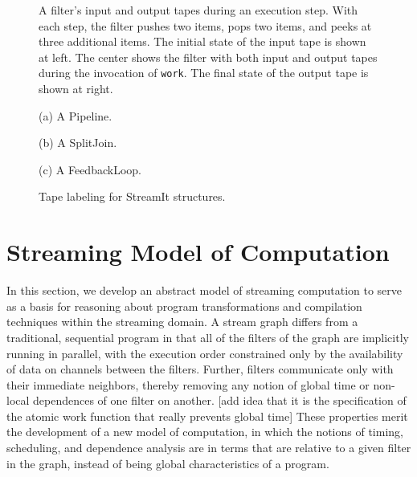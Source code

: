 \begin{figure}
\centering
\caption{A filter's input and output tapes during an execution step.
With each step, the filter pushes two items, pops two items, and peeks
at three additional items.  The initial state of the input tape is
shown at left.  The center shows the filter with both input and output
tapes during the invocation of {\tt work}.  The final state of the
output tape is shown at right.}
\label{fig:tape}
\end{figure}

\begin{figure}
\centering

(a) A Pipeline. \\
\vspace{8pt}

(b) A SplitJoin. \\
\vspace{8pt}

(c) A FeedbackLoop. \\
\vspace{8pt}
\caption{Tape labeling for StreamIt structures.}
\label{fig:tapelabels}
\end{figure}

\section{Streaming Model of Computation}

In this section, we develop an abstract model of streaming computation
to serve as a basis for reasoning about program transformations and
compilation techniques within the streaming domain.  A stream graph
differs from a traditional, sequential program in that all of the
filters of the graph are implicitly running in parallel, with the
execution order constrained only by the availability of data on
channels between the filters.  Further, filters communicate only with
their immediate neighbors, thereby removing any notion of global time
or non-local dependences of one filter on another.  [add idea that it
is the specification of the atomic work function that really prevents
global time] These properties merit the development of a new model of
computation, in which the notions of timing, scheduling, and
dependence analysis are in terms that are relative to a given filter
in the graph, instead of being global characteristics of a program.

